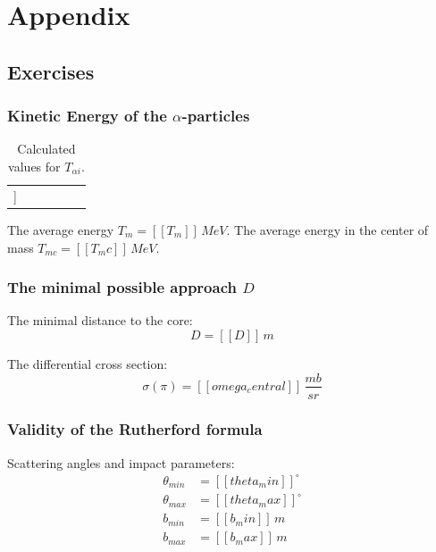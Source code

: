 \documentclass[a4paper]{article}
\begin{document}
\section{Appendix}

\subsection{Exercises}

\subsubsection{Kinetic Energy of the $\alpha$-particles}

\begin{table}[H]
\centering
\begin{tabular}{r|rrrrr}
\hline
[[table:Talphai]]
\end{tabular}
\caption{Calculated values for $T_{\alpha i}$.}
\end{table}

The average energy $T_m = [[T_m]] \, MeV$.
\newline
The average energy in the center of mass $T_{mc} = [[T_mc]] \, MeV$.

\subsubsection{The minimal possible approach $D$}
\label{sec:min_approach}

The minimal distance to the core:
\begin{equation}
D = [[D]] \, m
\end{equation}

The differential cross section:
\begin{equation}
\sigma(\pi) = [[omega_central]] \, \frac{mb}{sr}
\end{equation}

\subsubsection{Validity of the Rutherford formula}
\label{sec:validity}

Scattering angles and impact parameters:
\begin{align}
\theta_{min} &= [[theta_min]] ^{\circ} \\
\theta_{max} &= [[theta_max]] ^{\circ} \\ 
b_{min} &= [[b_min]] \, m \\ 
b_{max} &= [[b_max]] \, m
\end{align}
\end{document}
